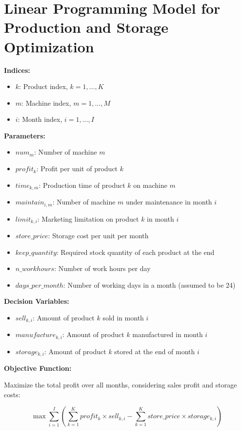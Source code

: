 \documentclass{article}
\begin{document}
\section*{Linear Programming Model for Production and Storage Optimization}

\textbf{Indices:}
\begin{itemize}
    \item $k$: Product index, $k = 1, \ldots, K$
    \item $m$: Machine index, $m = 1, \ldots, M$
    \item $i$: Month index, $i = 1, \ldots, I$
\end{itemize}

\textbf{Parameters:}
\begin{itemize}
    \item $num_{m}$: Number of machine $m$
    \item $profit_{k}$: Profit per unit of product $k$
    \item $time_{k, m}$: Production time of product $k$ on machine $m$
    \item $maintain_{i, m}$: Number of machine $m$ under maintenance in month $i$
    \item $limit_{k, i}$: Marketing limitation on product $k$ in month $i$
    \item $store\_price$: Storage cost per unit per month
    \item $keep\_quantity$: Required stock quantity of each product at the end
    \item $n\_workhours$: Number of work hours per day
    \item $days\_per\_month$: Number of working days in a month (assumed to be 24)
\end{itemize}

\textbf{Decision Variables:}
\begin{itemize}
    \item $sell_{k, i}$: Amount of product $k$ sold in month $i$
    \item $manufacture_{k, i}$: Amount of product $k$ manufactured in month $i$
    \item $storage_{k, i}$: Amount of product $k$ stored at the end of month $i$
\end{itemize}

\textbf{Objective Function:}

Maximize the total profit over all months, considering sales profit and storage costs:

\[
\max \sum_{i=1}^{I} \left( \sum_{k=1}^{K} profit_{k} \times sell_{k, i} - \sum_{k=1}^{K} store\_price \times storage_{k, i} \right)
\]
\end{document}
